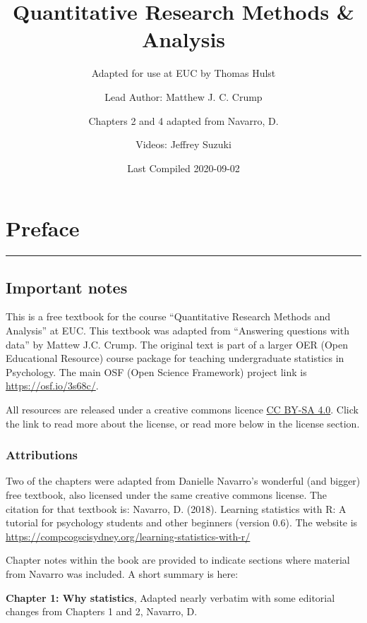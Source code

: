 \documentclass[
]{book}
\title{Quantitative Research Methods \& Analysis}
\author{Adapted for use at EUC by Thomas Hulst \and Lead Author: Matthew J. C. Crump \and Chapters 2 and 4 adapted from Navarro, D. \and Videos: Jeffrey Suzuki}
\date{Last Compiled 2020-09-02}
\begin{document}
\maketitle

{
\setcounter{tocdepth}{1}
\tableofcontents
}
\hypertarget{preface}{%
\chapter*{Preface}\label{preface}}

\begin{center}\rule{0.5\linewidth}{0.5pt}\end{center}

\hypertarget{important-notes}{%
\section{Important notes}\label{important-notes}}

This is a free textbook for the course ``Quantitative Research Methods and Analysis'' at EUC. This textbook was adapted from ``Answering questions with data'' by Mattew J.C. Crump. The original text is part of a larger OER (Open Educational Resource) course package for teaching undergraduate statistics in Psychology. The main OSF (Open Science Framework) project link is \url{https://osf.io/3s68c/}.

All resources are released under a creative commons licence \href{https://creativecommons.org/licenses/by-sa/4.0/}{CC BY-SA 4.0}. Click the link to read more about the license, or read more below in the license section.

\hypertarget{attributions}{%
\subsection{Attributions}\label{attributions}}

Two of the chapters were adapted from Danielle Navarro's wonderful (and bigger) free textbook, also licensed under the same creative commons license. The citation for that textbook is: Navarro, D. (2018). Learning statistics with R: A tutorial for psychology students and other beginners (version 0.6). The website is \url{https://compcogscisydney.org/learning-statistics-with-r/}

Chapter notes within the book are provided to indicate sections where material from Navarro was included. A short summary is here:

\textbf{Chapter 1: Why statistics}, Adapted nearly verbatim with some editorial changes from Chapters 1 and 2, Navarro, D.
\end{document}
